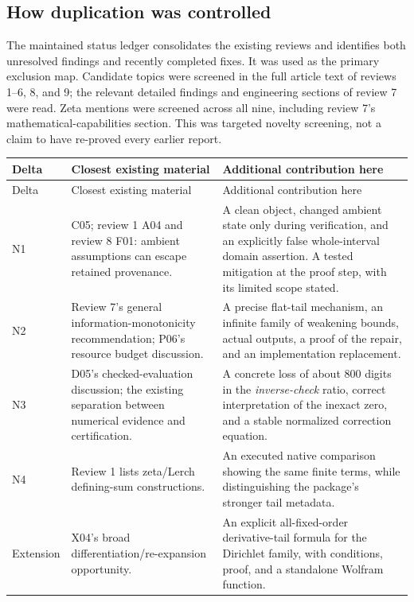 \documentclass[11pt,letterpaper]{article}
\begin{document}
\subsection{How duplication was controlled}
The maintained status ledger consolidates the existing reviews and identifies
both unresolved findings and recently completed fixes. It was used as the
primary exclusion map. Candidate topics were screened in the full article text
of reviews 1--6, 8, and 9; the relevant detailed findings and engineering
sections of review 7 were read. Zeta mentions were screened across all nine,
including review 7's mathematical-capabilities section. This was targeted
novelty screening, not a claim to have re-proved every earlier report.
\cite{reviewindex,status,r1,r7findings,r7engineering,r8}

\begin{longtable}{@{}P{0.64in}P{2.35in}P{3.05in}@{}}
\toprule Delta & Closest existing material & Additional contribution here\\\midrule
\endfirsthead
\toprule Delta & Closest existing material & Additional contribution here\\\midrule
\endhead
N1 & C05; review 1 A04 and review 8 F01: ambient assumptions can escape retained
provenance. & A clean object, changed ambient state only during verification,
and an explicitly false whole-interval domain assertion. A tested mitigation
at the proof step, with its limited scope stated.\\
N2 & Review 7's general information-monotonicity recommendation; P06's resource
budget discussion. & A precise flat-tail mechanism, an infinite family of
weakening bounds, actual outputs, a proof of the repair, and an implementation
replacement.\\
N3 & D05's checked-evaluation discussion; the existing separation between
numerical evidence and certification. & A concrete loss of about 800 digits
in the \emph{inverse-check} ratio, correct interpretation of the inexact zero,
and a stable normalized correction equation.\\
N4 & Review 1 lists zeta/Lerch defining-sum constructions. & An executed native
comparison showing the same finite terms, while distinguishing the package's
stronger tail metadata.\\
Extension & X04's broad differentiation/re-expansion opportunity. & An explicit
all-fixed-order derivative-tail formula for the Dirichlet family, with conditions,
proof, and a standalone Wolfram function.\\
\bottomrule
\end{longtable}
\end{document}
